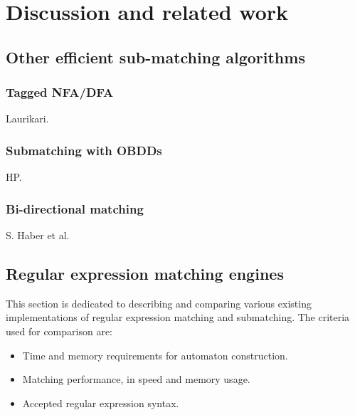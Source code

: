 \chapter{Discussion and related work}
\label{discussion}

\section{Other efficient sub-matching algorithms}

\subsection{Tagged NFA/DFA}

Laurikari.


\subsection{Submatching with OBDDs}

HP.


\subsection{Bi-directional matching}

S. Haber et al.


\section{Regular expression matching engines}

This section is dedicated to describing and comparing various existing
implementations of regular expression matching and submatching. The criteria
used for comparison are:

\begin{itemize}
   \item Time and memory requirements for automaton construction.
   \item Matching performance, in speed and memory usage.
   \item Accepted regular expression syntax.
\end{itemize}





